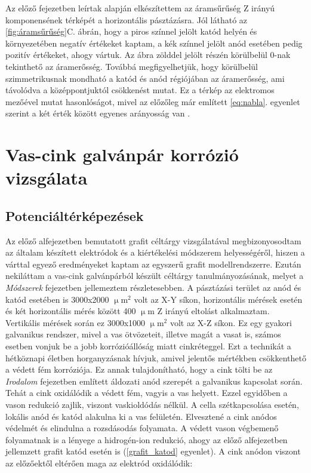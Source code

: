 Az előző fejezetben leírtak alapján elkészítettem az áramsűrűség Z irányú komponensének térképét a horizontális pásztázásra. Jól látható az \ref{fig:áramsűrűség}C. ábrán, hogy a piros színnel jelölt katód helyén és környezetében negatív értékeket kaptam, a kék színnel jelölt anód esetében pedig pozitív értékeket, ahogy vártuk. Az ábra zölddel jelölt részén körülbelül 0-nak tekinthető az áramerősség. Továbbá megfigyelhetjük, hogy körülbelül szimmetrikusnak mondható a katód és anód régiójában az áramerősség, ami távolódva a középpontjuktól csökkenést mutat. Ez a térkép az elektromos mezőével mutat hasonlóságot, mivel az előzőleg már említett \ref{eq:nabla}. egyenlet szerint a két érték között egyenes arányosság van \cite{isaacs1981scanning,bastos2017application}.

\section{Vas-cink galvánpár korrózió vizsgálata}
\subsection{Potenciáltérképezések}
Az előző alfejezetben bemutatott grafit céltárgy vizsgálatával megbizonyosodtam az általam készített elektródok és a kiértékelési módszerem helyességéről, hiszen a várttal egyező eredményeket kaptam az egyszerű grafit modellrendszerre. Ezután nekiláttam a vas-cink galvánpárból készült céltárgy tanulmányozásának, melyet a \emph{Módszerek} fejezetben jellemeztem részletesebben. A pásztázási terület az anód és katód esetében is 3000x2000 $\upmu$m$^2$ volt az X-Y síkon, horizontális mérések esetén és két horizontális mérés között 400 $\upmu$m Z irányú eltolást alkalmaztam. Vertikális mérések során ez 3000x1000 $\upmu$m$^2$ volt az X-Z síkon. Ez egy gyakori galvanikus rendszer, mivel a vas ötvözeteit, illetve magát a vasat is, számos esetben vonjuk be a jobb korrózióállóság miatt cinkréteggel. Ezt a technikát a hétköznapi életben horganyzásnak hívjuk, amivel jelentős mértékben csökkenthető a védett fém korróziója. Ez annak tulajdonítható, hogy a cink tölti be az \emph{Irodalom} fejezetben említett áldozati anód szerepét a galvanikus kapcsolat során. Tehát a cink oxidálódik a védett fém, vagyis a vas helyett. Ezzel egyidőben a vason redukció zajlik, viszont vaskioldódás nélkül. A cella szétkapcsolása esetén, lokális anód és katód alakulna ki a vas felületén. Elvesztené a cink anódos védelmét és elindulna a rozsdásodás folyamata.
A védett vason végbemenő folyamatnak is a lényege a hidrogén-ion redukció, ahogy az előző alfejezetben jellemzett grafit katód esetén is (\ref{grafit_katod} egyenlet). A cink anódon viszont az előzőektől eltérően maga az elektród oxidálódik:


